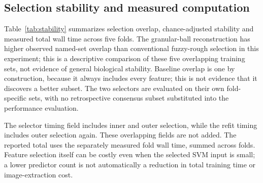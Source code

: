 \documentclass[11pt,a4paper]{article}
\begin{document}
\subsection{Selection stability and measured computation}
Table~\ref{tab:stability} summarizes selection overlap, chance-adjusted stability and measured total wall time across five folds. The granular-ball reconstruction has higher observed named-set overlap than conventional fuzzy-rough selection in this experiment; this is a descriptive comparison of these five overlapping training sets, not evidence of general biological stability. Baseline overlap is one by construction, because it always includes every feature; this is not evidence that it discovers a better subset. The two selectors are evaluated on their own fold-specific sets, with no retrospective consensus subset substituted into the performance evaluation.
\begin{table}[htbp]\centering\small
\setlength{\tabcolsep}{5pt}\StabilityTable
\caption{Descriptive stability across five overlapping outer training sets and observed wall time. Methods ran sequentially with two SVM candidate workers and native threads limited to one. Desktop background activity was not controlled; times are machine dependent.}\label{tab:stability}
\end{table}
The selector timing field includes inner and outer selection, while the refit timing includes outer selection again. These overlapping fields are not added. The reported total uses the separately measured fold wall time, summed across folds. Feature selection itself can be costly even when the selected SVM input is small; a lower predictor count is not automatically a reduction in total training time or image-extraction cost.
\end{document}

